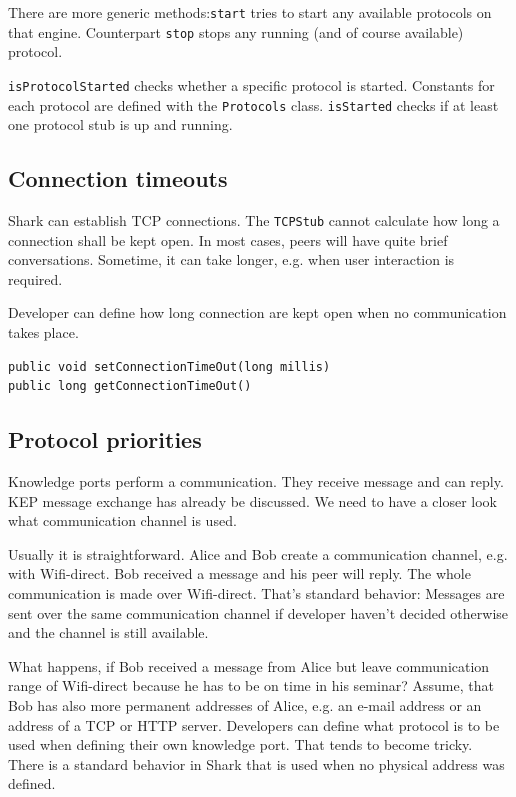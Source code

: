 There are more generic methods:{\tt start} tries to start any available protocols on that engine. Counterpart {\tt stop} stops any running (and of course available) protocol. 

{\tt isProtocolStarted} checks whether a specific protocol is started. Constants for each protocol are defined with the {\tt Protocols} class. {\tt isStarted} checks if at least one protocol stub is up and running.

\subsection{Connection timeouts}
Shark can establish TCP connections. The {\tt TCPStub} cannot calculate how long a connection shall be kept open. In most cases, peers will have quite brief conversations. Sometime, it can take longer, e.g. when user interaction is required. 

Developer can define how long connection are kept open when no communication takes place. 

\begin{verbatim}
public void setConnectionTimeOut(long millis)
public long getConnectionTimeOut()
\end{verbatim}

\subsection{Protocol priorities}
\label{sec:se:protocolPriorities}
Knowledge ports perform a communication. They receive message and can reply. KEP message exchange has already be discussed. We need to have a closer look what communication channel is used.

Usually it is straightforward. Alice and Bob create a communication channel, e.g. with Wifi-direct. Bob received a message and his peer will reply. The whole communication is made over Wifi-direct. That's standard behavior: Messages are sent over the same communication channel if developer haven't decided otherwise and the channel is still available.

What happens, if Bob received a message from Alice but leave communication range of Wifi-direct because he has to be on time in his seminar? Assume, that Bob has also more permanent addresses of Alice, e.g. an e-mail address or an address of a TCP or HTTP server. Developers can define what protocol is to be used when defining their own knowledge port. That tends to become tricky. There is a standard behavior in Shark that is used when no physical address was defined.

